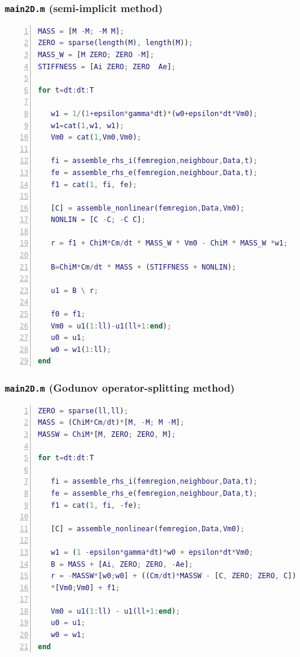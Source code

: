 \documentclass[a4paper,11pt]{article}
\begin{document}
\subsubsection{\texttt{main2D.m} (semi-implicit method)}\label{SI}
\begin{lstlisting}[language=Matlab,basicstyle=\small, numbers=left, numberstyle=\tiny,  name = main2D.m (semi-implicit), frame=single]
MASS = [M -M; -M M];
ZERO = sparse(length(M), length(M));
MASS_W = [M ZERO; ZERO -M];
STIFFNESS = [Ai ZERO; ZERO  Ae];

for t=dt:dt:T

   w1 = 1/(1+epsilon*gamma*dt)*(w0+epsilon*dt*Vm0);
   w1=cat(1,w1, w1);
   Vm0 = cat(1,Vm0,Vm0);

   fi = assemble_rhs_i(femregion,neighbour,Data,t);
   fe = assemble_rhs_e(femregion,neighbour,Data,t);
   f1 = cat(1, fi, fe);

   [C] = assemble_nonlinear(femregion,Data,Vm0);
   NONLIN = [C -C; -C C];

   r = f1 + ChiM*Cm/dt * MASS_W * Vm0 - ChiM * MASS_W *w1;

   B=ChiM*Cm/dt * MASS + (STIFFNESS + NONLIN);

   u1 = B \ r;

   f0 = f1;
   Vm0 = u1(1:ll)-u1(ll+1:end);
   u0 = u1;
   w0 = w1(1:ll);
end
\end{lstlisting}

\subsubsection{\texttt{main2D.m} (Godunov operator-splitting method)}\label{GO}
\begin{lstlisting}[language=Matlab,basicstyle=\small, numbers=left, numberstyle=\tiny,  name = main2D.m (Godunov operator-splitting), frame=single]
ZERO = sparse(ll,ll);
MASS = (ChiM*Cm/dt)*[M, -M; M -M];
MASSW = ChiM*[M, ZERO; ZERO, M];

for t=dt:dt:T

   fi = assemble_rhs_i(femregion,neighbour,Data,t);
   fe = assemble_rhs_e(femregion,neighbour,Data,t);
   f1 = cat(1, fi, -fe);

   [C] = assemble_nonlinear(femregion,Data,Vm0);

   w1 = (1 -epsilon*gamma*dt)*w0 + epsilon*dt*Vm0;
   B = MASS + [Ai, ZERO; ZERO, -Ae];
   r = -MASSW*[w0;w0] + ((Cm/dt)*MASSW - [C, ZERO; ZERO, C])
   *[Vm0;Vm0] + f1;

   Vm0 = u1(1:ll) - u1(ll+1:end);
   u0 = u1;
   w0 = w1;
end
\end{lstlisting}
\end{document}
